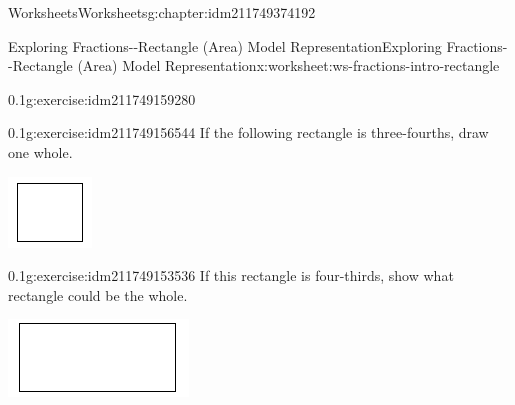 \documentclass[twoside,11pt,]{book}
\begin{document}
\begin{chapterptx}{Worksheets}{}{Worksheets}{}{}{g:chapter:idm211749374192}
\begin{worksheet-section-numberless}{Exploring Fractions-{}-{}Rectangle (Area) Model Representation}{}{Exploring Fractions-{}-{}Rectangle (Area) Model Representation}{}{}{x:worksheet:ws-fractions-intro-rectangle}
\begin{divisionexercise}{2}{}{0.1}{g:exercise:idm211749159280}
\begin{sidebyside}{1}{0.3}{0.3}{0}
\begin{sbspanel}{0.4}
\end{sbspanel}%
\end{sidebyside}%
%
\end{divisionexercise}%
\begin{divisionexercise}{3}{}{0.1}{g:exercise:idm211749156544}%
If the following rectangle is three-fourths, draw one whole. \begin{sidebyside}{1}{0.35}{0.35}{0}%
\begin{sbspanel}{0.3}%
\includegraphics[width=1\linewidth]{images/generic-square.png}
\end{sbspanel}%
\end{sidebyside}%
%
\end{divisionexercise}%
\clearpage
\begin{divisionexercise}{4}{}{0.1}{g:exercise:idm211749153536}%
If this rectangle is four-thirds, show what rectangle could be the whole. \begin{sidebyside}{1}{0.3}{0.3}{0}%
\begin{sbspanel}{0.4}%
\includegraphics[width=1\linewidth]{images/generic-rectangle.png}

\end{sbspanel}
\end{sidebyside}
\end{divisionexercise}
\end{worksheet-section-numberless}
\end{chapterptx}
\end{document}
